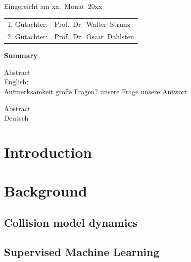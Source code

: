 \thispagestyle{empty}\vspace*{48em}

Eingereicht am xx.~Monat~20xx\vspace{1.5em}
\par{\large\begin{tabular}{ll}
 1. Gutachter: & Prof.~Dr.~Walter~Strunz \\
 2. Gutachter: & Prof.~Dr.~Oscar~Dahlsten \\
\end{tabular}}


\newpage
\begin{center}\large\bfseries Summary\end{center}


Abstract \\ 
English: \\
Aufmerksamkeit
große Fragen?
unsere Frage
unsere Antwort

\vspace{20em}
Abstract \\ 
Deutsch \\
 
 
\tableofcontents



\mainmatter

\chapter{Introduction}


\chapter{Background} \label{background}
\section{Collision model dynamics} \label{col_model}


%
\section{Supervised Machine Learning} \label{sml}



